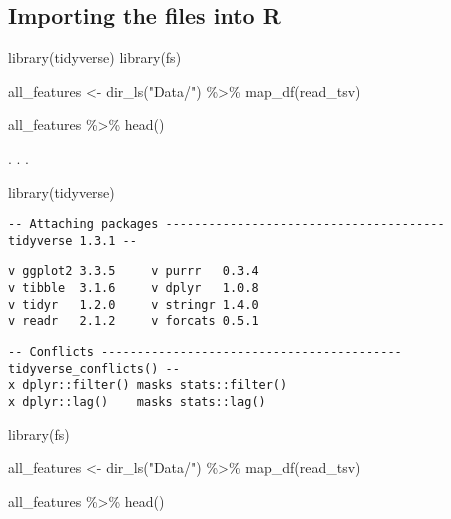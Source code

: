 \documentclass[
  letterpaper,
  DIV=11,
  numbers=noendperiod]{scrreprt}
\newenvironment{Shaded}{\begin{snugshade}}{\end{snugshade}}
\newcommand{\FunctionTok}[1]{\textcolor[rgb]{0.28,0.35,0.67}{#1}}
\newcommand{\NormalTok}[1]{\textcolor[rgb]{0.00,0.46,0.62}{#1}}
\newcommand{\OtherTok}[1]{\textcolor[rgb]{0.00,0.46,0.62}{#1}}
\newcommand{\SpecialCharTok}[1]{\textcolor[rgb]{0.37,0.37,0.37}{#1}}
\newcommand{\StringTok}[1]{\textcolor[rgb]{0.13,0.47,0.30}{#1}}
\begin{document}
\hypertarget{importing-the-files-into-r}{%
\subsection*{Importing the files into
R}\label{importing-the-files-into-r}}

\begin{Shaded}
\begin{Highlighting}[]
\FunctionTok{library}\NormalTok{(tidyverse)}
\FunctionTok{library}\NormalTok{(fs)}

\NormalTok{all\_features }\OtherTok{\textless{}{-}} \FunctionTok{dir\_ls}\NormalTok{(}\StringTok{"Data/"}\NormalTok{) }\SpecialCharTok{\%\textgreater{}\%} 
  \FunctionTok{map\_df}\NormalTok{(read\_tsv)}

\NormalTok{all\_features }\SpecialCharTok{\%\textgreater{}\%} 
  \FunctionTok{head}\NormalTok{()}
\end{Highlighting}
\end{Shaded}

. . .

\begin{Shaded}
\begin{Highlighting}[]
\FunctionTok{library}\NormalTok{(tidyverse)}
\end{Highlighting}
\end{Shaded}

\begin{verbatim}
-- Attaching packages --------------------------------------- tidyverse 1.3.1 --
\end{verbatim}

\begin{verbatim}
v ggplot2 3.3.5     v purrr   0.3.4
v tibble  3.1.6     v dplyr   1.0.8
v tidyr   1.2.0     v stringr 1.4.0
v readr   2.1.2     v forcats 0.5.1
\end{verbatim}

\begin{verbatim}
-- Conflicts ------------------------------------------ tidyverse_conflicts() --
x dplyr::filter() masks stats::filter()
x dplyr::lag()    masks stats::lag()
\end{verbatim}

\begin{Shaded}
\begin{Highlighting}[]
\FunctionTok{library}\NormalTok{(fs)}

\NormalTok{all\_features }\OtherTok{\textless{}{-}} \FunctionTok{dir\_ls}\NormalTok{(}\StringTok{"Data/"}\NormalTok{) }\SpecialCharTok{\%\textgreater{}\%} 
  \FunctionTok{map\_df}\NormalTok{(read\_tsv)}

\NormalTok{all\_features }\SpecialCharTok{\%\textgreater{}\%} 
  \FunctionTok{head}\NormalTok{()}
\end{Highlighting}
\end{Shaded}
\end{document}
